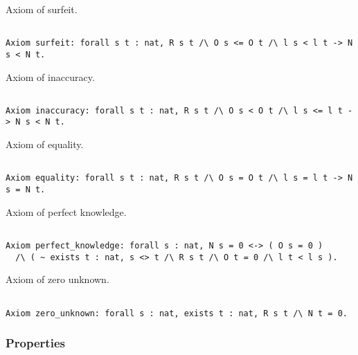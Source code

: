 Axiom of surfeit.

\begin{sourcecode}
{\scriptsize \begin{verbatim}

Axiom surfeit: forall s t : nat, R s t /\ O s <= O t /\ l s < l t -> N s < N t.

\end{verbatim}}
\end{sourcecode}

Axiom of inaccuracy.

\begin{sourcecode}
{\scriptsize \begin{verbatim}

Axiom inaccuracy: forall s t : nat, R s t /\ O s < O t /\ l s <= l t -> N s < N t.

\end{verbatim}}
\end{sourcecode}

Axiom of equality.

\begin{sourcecode}
{\scriptsize \begin{verbatim}

Axiom equality: forall s t : nat, R s t /\ O s = O t /\ l s = l t -> N s = N t.

\end{verbatim}}
\end{sourcecode}

Axiom of perfect knowledge.

\begin{sourcecode}
{\scriptsize \begin{verbatim}

Axiom perfect_knowledge: forall s : nat, N s = 0 <-> ( O s = 0 )
  /\ ( ~ exists t : nat, s <> t /\ R s t /\ O t = 0 /\ l t < l s ).

\end{verbatim}}
\end{sourcecode}

Axiom of zero unknown.

\begin{sourcecode}
{\scriptsize \begin{verbatim}

Axiom zero_unknown: forall s : nat, exists t : nat, R s t /\ N t = 0.

\end{verbatim}}
\end{sourcecode}

\subsubsection*{Properties}

